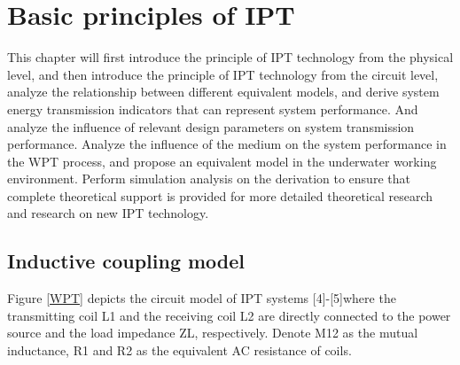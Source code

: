 \chapter{Basic principles of IPT}
This chapter will first introduce the principle of IPT technology from the physical level, and then introduce the principle of IPT technology from the circuit level, analyze the relationship between different equivalent models, and derive system energy transmission indicators that can represent system performance. And analyze the influence of relevant design parameters on system transmission performance. Analyze the influence of the medium on the system performance in the WPT process, and propose an equivalent model in the underwater working environment. Perform simulation analysis on the derivation to ensure that complete theoretical support is provided for more detailed theoretical research and research on new IPT technology.
\section{Inductive coupling model}
Figure \ref{WPT} depicts the circuit model of IPT systems [4]-[5]where the transmitting coil L1 and the receiving coil L2 are
directly connected to the power source and the load impedance
ZL, respectively. Denote M12 as the mutual inductance, R1 and
R2 as the equivalent AC resistance of coils.


